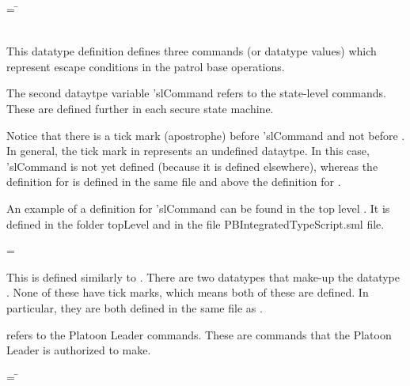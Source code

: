 \documentclass[../../main/main.tex]{subfiles}
\begin{document}
 \begin{tabbing}
  = \=  \\
 						\>\HOLTokenBar{}  \\
						\>\HOLTokenBar{} 
           \HOLTokenBar{} 
\end{tabbing}

This datatype definition defines three commands (or datatype values) which represent escape conditions in the patrol base operations.  

The second dataytpe variable 'slCommand refers to the state-level commands.  These are defined further in each secure state machine.  

Notice that there is a tick mark (apostrophe) before 'slCommand and not before .  In general, the tick mark in  represents an undefined dataytpe.  In this case, 'slCommand is not yet defined (because it is defined elsewhere), whereas the definition for  is defined in the same file and above the definition for .   

An example of a definition for 'slCommand can be found in the top level .  It is defined in the folder topLevel and in the file PBIntegratedTypeScript.sml file.

 =   \HOLTokenBar{}  

This is defined similarly to .  There are two datatypes that make-up the datatype .  None of these have tick marks, which means both of these are defined.  In particular, they are both defined in the same file as .

 refers to the Platoon Leader commands.  These are commands that the Platoon Leader is authorized to make.  

\begin{tabbing}
 = \=  \\
					     \>\HOLTokenBar{}  \\
					     \>\HOLTokenBar{}  \\
					     \>\HOLTokenBar{} \\
         				     \> \HOLTokenBar{}  \\
				             \> \HOLTokenBar{} 
\end{tabbing}
\end{document}
